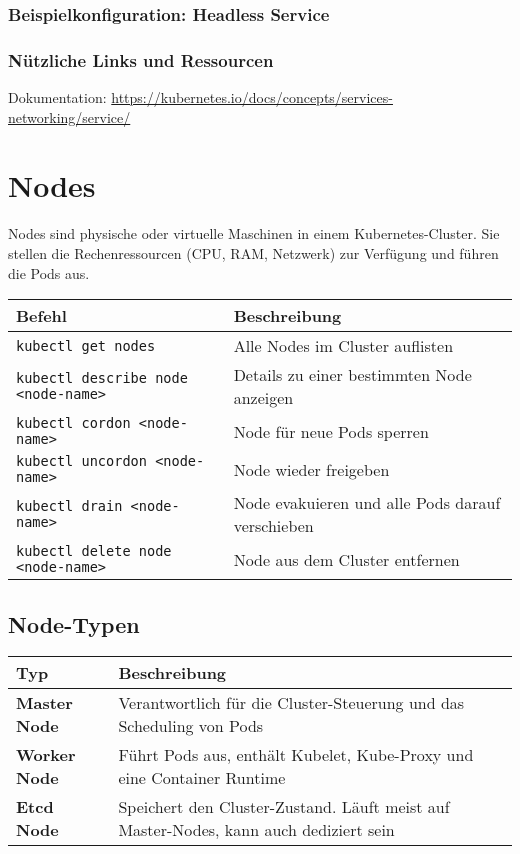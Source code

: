 \subsubsection{Beispielkonfiguration: Headless Service}


\subsubsection{Nützliche Links und Ressourcen}
Dokumentation: \url{https://kubernetes.io/docs/concepts/services-networking/service/}
\newpage
\section{Nodes}
Nodes sind physische oder virtuelle Maschinen in einem Kubernetes-Cluster. Sie stellen die Rechenressourcen (CPU, RAM, Netzwerk) zur Verfügung und führen die Pods aus.\\

\noindent
\begin{tabular}{|p{}|p{}|}
\hline
\textbf{Befehl} & \textbf{Beschreibung} \\
\hline
\texttt{kubectl get nodes} & Alle Nodes im Cluster auflisten \\
\texttt{kubectl describe node <node-name>} & Details zu einer bestimmten Node anzeigen \\
\texttt{kubectl cordon <node-name>} & Node für neue Pods sperren \\
\texttt{kubectl uncordon <node-name>} & Node wieder freigeben \\
\texttt{kubectl drain <node-name>} & Node evakuieren und alle Pods darauf verschieben \\
\texttt{kubectl delete node <node-name>} & Node aus dem Cluster entfernen \\
\hline
\end{tabular}
\subsection{Node-Typen}
\begin{tabular}{|p{}|p{}|}
\hline
\textbf{Typ} & \textbf{Beschreibung} \\
\hline
\textbf{Master Node} & Verantwortlich für die Cluster-Steuerung und das Scheduling von Pods \\
\textbf{Worker Node} & Führt Pods aus, enthält Kubelet, Kube-Proxy und eine Container Runtime \\
\textbf{Etcd Node} & Speichert den Cluster-Zustand. Läuft meist auf Master-Nodes, kann auch dediziert sein \\
\hline
\end{tabular}

